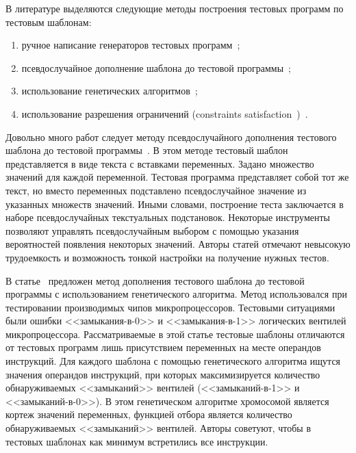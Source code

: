 В литературе выделяются следующие методы построения тестовых программ по тестовым шаблонам:
\begin{enumerate}
	\item ручное написание генераторов тестовых программ~\cite{MicroTESK};
	\item псевдослучайное дополнение шаблона до тестовой программы~\cite{SEGUE1, SEGUE2, PA-RISC, TSE, Theo, mVpGen};
	\item использование генетических алгоритмов~\cite{GeneticTemplates};
	\item использование разрешения ограничений (constraints satisfaction~\cite{CLPusingECLiPSe})~\cite{GenesysPro, GenesysPro2004Innovations, DeepTrans, RAVEN, MAATG}.
\end{enumerate}

Довольно много работ следует методу псевдослучайного дополнения тестового шаблона до тестовой программы~\cite{SEGUE1, SEGUE2, PA-RISC, TSE, Theo, mVpGen}. В этом методе тестовый шаблон представляется в виде текста с вставками переменных. Задано множество значений для каждой переменной. Тестовая программа представляет собой тот же текст, но вместо переменных подставлено псевдослучайное значение из указанных множеств значений. Иными словами, построение теста заключается в наборе псевдослучайных текстуальных подстановок. Некоторые инструменты позволяют управлять псевдослучайным выбором с помощью указания вероятностей появления некоторых значений. Авторы статей отмечают невысокую трудоемкость и возможность тонкой настройки на получение нужных тестов.

В статье~\cite{GeneticTemplates} предложен метод дополнения тестового шаблона до тестовой программы с использованием генетического алгоритма. Метод использовался при тестировании производимых чипов микропроцессоров. Тестовыми ситуациями были ошибки <<замыкания-в-0>> и <<замыкания-в-1>> логических вентилей микропроцессора. Рассматриваемые в этой статье тестовые шаблоны отличаются от тестовых программ лишь присутствием переменных на месте операндов инструкций. Для каждого шаблона с помощью генетического алгоритма ищутся значения операндов инструкций, при которых максимизируется количество обнаруживаемых <<замыканий>> вентилей (<<замыканий-в-1>> и <<замыканий-в-0>>). В этом генетическом алгоритме хромосомой является кортеж значений переменных, функцией отбора является количество обнаруживаемых <<замыканий>> вентилей. Авторы советуют, чтобы в тестовых шаблонах как минимум встретились все инструкции.


